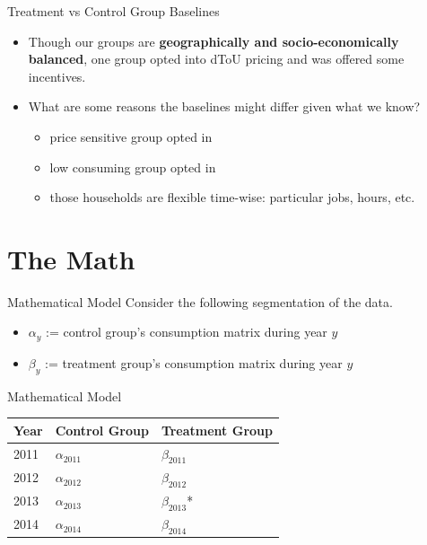 \documentclass{beamer}
\begin{document}
\begin{frame}{Treatment vs Control Group Baselines}
  \begin{itemize}
    \item<+-> Though our groups are \textbf{geographically and socio-economically balanced}, one group opted into dToU pricing and was offered some incentives.
    \item<+-> What are some reasons the baselines might differ given what we know?
    \begin{itemize}
      \item<+-> price sensitive group opted in
      \item<+-> low consuming group opted in
      \item<+-> those households are flexible time-wise: particular jobs, hours, etc.
    \end{itemize}
  \end{itemize}
\end{frame}

\section{The Math}

\begin{frame}{Mathematical Model}
  Consider the following segmentation of the data.
  \begin{itemize}
    \item $\alpha_y$ := control group's consumption matrix during year $y$
    \item $\beta_y$ := treatment group's consumption matrix during year $y$
  \end{itemize}
\end{frame}

\begin{frame}{Mathematical Model}
  \begin{table}[h!]
  \centering
    \begin{tabular}{|p{3cm}|p{3.5cm}|p{3.5cm}|}
        \hline
        Year & Control Group & Treatment Group \\
        \hline
        2011 & $\alpha_{2011}$ & $\beta_{2011}$ \\
        2012 & $\alpha_{2012}$ & $\beta_{2012}$ \\
        2013 & $\alpha_{2013}$ & $\beta_{2013}$* \\
        2014 & $\alpha_{2014}$ & $\beta_{2014}$ \\
        \hline
    \end{tabular}
  \end{table}
\end{frame}
\end{document}
